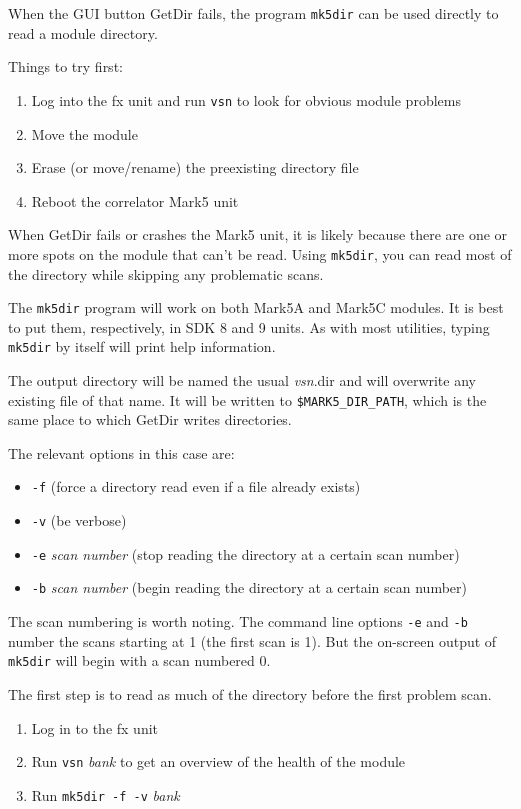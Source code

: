 When the GUI button GetDir fails, the program {\tt mk5dir} can be used directly to read a module directory.

Things to try first:
\begin{enumerate}
\item Log into the fx unit and run {\tt vsn} to look for obvious module problems
\item Move the module
\item Erase (or move/rename) the preexisting directory file
\item Reboot the correlator Mark5 unit
\end{enumerate}

When GetDir fails or crashes the Mark5 unit, it is likely because there are one or more spots on the module that can't be read.
Using {\tt mk5dir}, you can read most of the directory while skipping any problematic scans.

The {\tt mk5dir} program will work on both Mark5A and Mark5C modules.
It is best to put them, respectively, in SDK 8 and 9 units.
As with most utilities, typing {\tt mk5dir} by itself will print help information.

The output directory will be named the usual {\em vsn}.dir and will overwrite
any existing file of that name. It will be written to {\tt \$MARK5\_DIR\_PATH}, which is the same place to which GetDir writes directories.

The relevant options in this case are:

\begin{itemize}
\item {\tt -f} (force a directory read even if a file already exists)
\item {\tt -v} (be verbose)
\item {\tt -e} {\em scan number} (stop reading the directory at a certain scan number)
\item {\tt -b} {\em scan number} (begin reading the directory at a certain scan number)
\end{itemize}

The scan numbering is worth noting.
The command line options {\tt -e} and {\tt -b} number the scans starting at 1 (the first scan is 1).
But the on-screen output of {\tt mk5dir} will begin with a scan numbered 0.

The first step is to read as much of the directory before the first problem scan.

\begin{enumerate}
\item Log in to the fx unit
\item Run {\tt vsn} {\em bank} to get an overview of the health of the module
\item Run {\tt mk5dir -f -v} {\em bank}
\end{enumerate}

